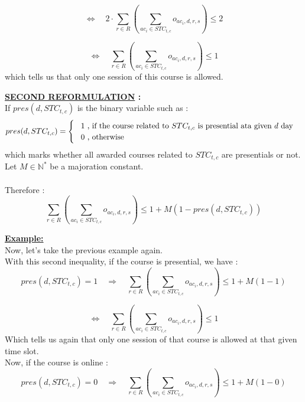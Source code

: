 \documentclass[12pt,a4paper]{article}
\begin{document}
\[
\Longleftrightarrow \quad 2 \cdot \sum_{r\in R}\left(\sum_{ac_{i} \in STC_{t,c}}{o_{ac_{i}, d, r, s}}\right)\leq 2
\]

\[
\Longleftrightarrow \quad \sum_{r\in R}\left(\sum_{ac_{i} \in STC_{t,c}}{o_{ac_{i}, d, r, s}}\right)\leq 1
\]
which tells us that only one session of this course is allowed.

\vspace{1cm}\textbf{\underline{SECOND REFORMULATION} :} \\

\vspace{0.5cm}If $pres(d, STC_{t,c})$ is the binary variable such as :
\[
	pres(d, STC_{t,c}) = 
	\begin{cases}
		\hspace{0.3cm} 1 \text{ , if the course related to $STC_{t,c}$ is presential ata given $d$ day} \\
		\hspace{0.3cm}0 \text{ , otherwise}
	\end{cases} 
\]	
which marks whether all awarded courses related to $STC_{t,c}$ are presentials or not. \\

Let $M \in \mathbb{N^{*}}$ be a majoration constant. \\ \\
Therefore :
\begin{equation}
\sum_{r\in R}\left(\sum_{ac_{i} \in STC_{t,c}}{o_{ac_{i}, d, r, s}}\right) \leq 1 + M(1 - pres(d, STC_{t,c}))
\end{equation}

\vspace{1cm}\textbf{\underline{Example:}}\vspace{0.3cm} \\ 
Now, let's take the previous example again. \\
With this second inequality, if the course is presential, we have : \\
\[
pres(d, STC_{t,c}) = 1 \quad \Longrightarrow \quad 
\sum_{r\in R}\left(\sum_{ac_{i} \in STC_{t,c}}{o_{ac_{i}, d, r, s}}\right) \leq 1 + M(1 - 1)
\]

\[
\Longleftrightarrow \quad
\sum_{r\in R}\left(\sum_{ac_{i} \in STC_{t,c}}{o_{ac_{i}, d, r, s}}\right) \leq 1
\]
Which tells us again that only one session of that course is allowed at that given time slot.\\

\vspace{0.5cm} Now, if the course is online : \\
\[
pres(d, STC_{t,c}) = 0 \quad \Longrightarrow \quad 
\sum_{r\in R}\left(\sum_{ac_{i} \in STC_{t,c}}{o_{ac_{i}, d, r, s}}\right) \leq 1 + M(1 - 0)
\]
\end{document}
